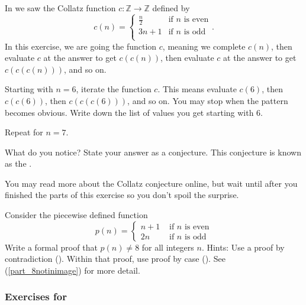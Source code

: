 \begin{exer}[\exerE] %
\label{exer_collatz_conjecture}
    In  we saw the Collatz function $c: \mathbb{Z} \to \mathbb{Z}$ defined by 
    $$c(n) =  \left\{ 
    \begin{array} {cl} 
    \frac{n}{2} & \text{if } n \text{ is even} \\ 
    3n+1 & \text{if } n \text{ is odd} \\  
    \end{array} 
    \right..$$  
    In this exercise, we are going  the function $c$, meaning we complete $c(n)$, then evaluate $c$ at the answer to get $c(c(n))$, then evaluate $c$ at the answer to get $c(c(c(n)))$, and so on.  
        \begin{exerpart}
            \item  Starting with $n=6$, iterate the function $c$.  This means evaluate $c(6)$, then $c(c(6))$, then $c(c(c(6)))$, and so on.  You may stop when the pattern becomes obvious.  Write down the list of values you get starting with 6.
            \item Repeat for $n=7$.
            \item What do you notice?  State your answer as a conjecture.  This conjecture is known as the . 
        \end{exerpart}
    You may read more about the Collatz conjecture online, but wait until after you finished the parts of this exercise so you don't spoil the surprise.
\end{exer}

\begin{exer}[\exerE] %
\label{exer_8isnotinimage}
    Consider the piecewise defined function 
        $$p(n) = \left\{ 
        \begin{array}{cc} 
            n+1 & \text{ if $n$ is even} \\
            2n & \text{ if $n$ is odd} 
        \end{array}
        \right.$$ 
    Write a formal proof that $p(n) \neq 8$ for all integers $n$.  Hints: Use a proof by contradiction ().  Within that proof, use proof by case ().  See  (\ref{part_8notinimage}) for more detail.
\end{exer}


\subsubsection*{Exercises for  \subfndotgraphs}

